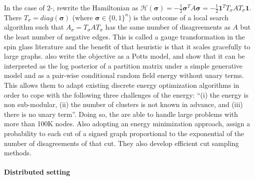 In the case of $2$-\pcc{}, \textcite{Facchetti2011isingmodel} rewrite the Hamiltonian as
$\mathcal{H}(\bm{\sigma}) = -\frac{1}{2}\bm{\sigma}^T A \bm{\sigma} = -\frac{1}{2}\bm{1}^TT_\sigma A
T_\sigma\bm{1}$. There $T_\sigma = diag(\bm{\sigma})$ (where $\bm{\sigma} \in \{0,1\}^n$) is the
outcome of a local search algorithm such that $A_\sigma = T_\sigma A T_\sigma$ has the same number
of disagreements as $A$ but the least number of negative edges. This is called a gauge
transformation in the spin glass literature and the benefit of that heuristic is that it scales
gracefully to large graphs.
\Textcite{Bagon2011} also write the \maxa{} objective as a Potts model, and show that it can be
interpreted as the log posterior of a partition matrix under a simple generative model and as a
pair-wise conditional random field energy without unary terms. This allows them to adapt existing
discrete energy optimization algorithms in order to cope with the following three challenges of the
\pcc{} energy: \enquote{(i) the energy is non sub-modular, (ii) the number of clusters is not known
in advance, and (iii) there is no unary term}. Doing so, the are able to handle large problems with
more than 100K nodes.  Also adopting an energy minimization approach, \textcite{Kappes2016} assign a
probability to each cut of a signed graph proportional to the exponential of the number of
disagreements of that cut. They also develop efficient cut sampling methods.



\paragraph{Distributed setting}

